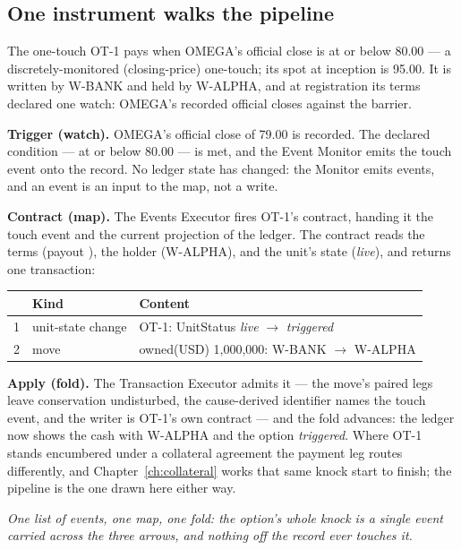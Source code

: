 \subsection{One instrument walks the pipeline}

The one-touch OT-1 pays  when OMEGA's official close is at or below
80.00 --- a discretely-monitored (closing-price) one-touch; its spot at inception is 95.00. It is written by \mbox{W-BANK} and held by
\mbox{W-ALPHA}, and at registration its terms declared one watch: OMEGA's recorded
official closes against the barrier.

\textbf{Trigger (watch).} OMEGA's official close of 79.00 is recorded. The declared
condition --- at or below 80.00 --- is met, and the Event Monitor emits the touch event
onto the record. No ledger state has changed: the Monitor emits events, and an event is an
input to the map, not a write.

\textbf{Contract (map).} The Events Executor fires OT-1's contract, handing it the touch
event and the current projection of the ledger. The contract reads the terms (payout
), the holder (\mbox{W-ALPHA}), and the unit's state (\emph{live}), and
returns one transaction:

\begin{center}
\begin{tabular}{@{}rll@{}}
\toprule
 & Kind & Content \\
\midrule
1 & unit-state change & OT-1: UnitStatus \emph{live} $\to$ \emph{triggered} \\
2 & move & owned(USD) 1{,}000{,}000: W-BANK $\to$ W-ALPHA \\
\bottomrule
\end{tabular}
\end{center}

\textbf{Apply (fold).} The Transaction Executor admits it --- the move's paired legs leave
conservation undisturbed, the cause-derived identifier names the touch event, and the
writer is OT-1's own contract --- and the fold advances: the ledger now shows the cash with
\mbox{W-ALPHA} and the option \emph{triggered}. Where OT-1 stands encumbered under a
collateral agreement the payment leg routes differently, and Chapter~\ref{ch:collateral}
works that same knock start to finish; the pipeline is the one drawn here either way.

\emph{One list of events, one map, one fold: the option's whole knock is a single event
carried across the three arrows, and nothing off the record ever touches it.}

